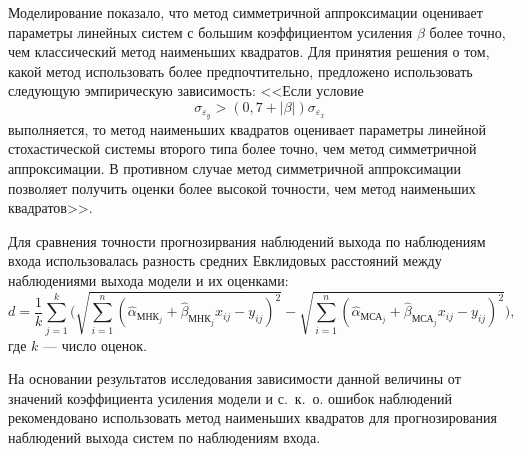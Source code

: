 Моделирование показало, что метод симметричной аппроксимации оценивает
параметры линейных систем с большим коэффициентом усиления \( \beta \) более точно,
чем классический метод наименьших квадратов.
Для принятия решения о том, какой метод использовать более предпочтительно,
предложено использовать следующую эмпирическую зависимость:
<<Если условие
\begin{equation*}
  \sigma_{\varepsilon_y} > (0{,}7 + |\beta|) \sigma_{\varepsilon_x}
\end{equation*}
выполняется, то метод наименьших квадратов оценивает параметры линейной
стохастической системы второго типа более точно, чем метод симметричной аппроксимации.
В противном случае метод симметричной аппроксимации позволяет получить
оценки более высокой точности, чем метод наименьших квадратов>>.

Для сравнения точности прогнозирвания наблюдений выхода по наблюдениям входа
использовалась разность средних Евклидовых расстояний между наблюдениями
выхода модели и их оценками:
\begin{equation*}
  d =
  \frac{1}{k} \sum_{j=1}^k
  \Bigg(
  \sqrt{ \sum_{i=1}^n (\hat{\alpha}_{\text{МНК}_j} + \hat{\beta}_{\text{МНК}_j} x_{ij} - y_{ij})^2} -
  \sqrt{ \sum_{i=1}^n (\hat{\alpha}_{\text{МСА}_j} + \hat{\beta}_{\text{МСА}_j} x_{ij} - y_{ij})^2}
  \Bigg),
\end{equation*}
где \( k \) --- число оценок.

На основании результатов исследования зависимости данной величины от значений коэффициента усиления модели
и с.~к.~о. ошибок наблюдений рекомендовано
использовать метод наименьших квадратов для прогнозирования наблюдений выхода систем по наблюдениям входа.

